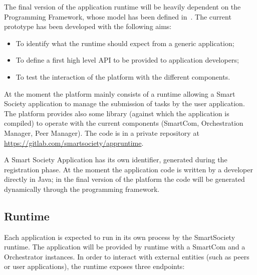 The final version of the application runtime will be heavily dependent on the Programming Framework, whose model has been defined in~\cite{D7.2}. The current prototype has been developed with the following aims: 
\begin{itemize}
	\item To identify what the runtime should expect from a generic application;
    \item To define a first high level API to be provided to application developers;
	\item To test the interaction of the platform with the different components.
\end{itemize}

At the moment the platform mainly consists of a runtime allowing a Smart Society application to manage the submission of tasks by the user application. The platform provides also some library (against which the application is compiled) to operate with the current components (SmartCom, Orchestration Manager, Peer Manager). The code is in a private repository at \url{https://gitlab.com/smartsociety/appruntime}.

A Smart Society Application has its own identifier, generated during the registration phase. At the moment the application code is written by a developer directly in Java; in the final version of the platform the code will be generated dynamically through the programming framework. %

\subsection{Runtime}
Each application is expected to run in its own process by the SmartSociety runtime. The application will be provided by runtime with a SmartCom and a Orchestrator instances. In order to interact with external entities (such as peers or user applications), the runtime exposes three endpoints:

